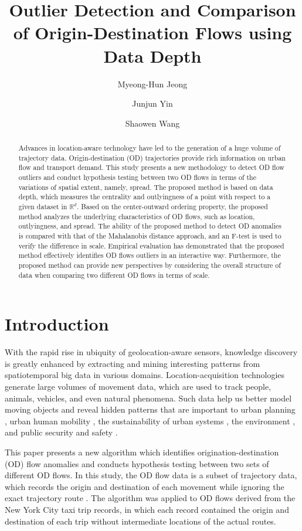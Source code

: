 \documentclass[a4paper,UKenglish]{lipics-v2018}
\title{Outlier Detection and Comparison of Origin-Destination Flows using Data Depth}
\author{Myeong-Hun Jeong}{Department of Civil Engineering, Chosun University, Gwangju, Republic of Korea}{mhjeong@chosun.ac.kr}{[orcid]}{[funding]}
\author{Junjun Yin}{Social Science Research Institute; Institute for CyberScience, Penn State University, PA, USA}{jyin@psu.edu}{[0000-0002-4196-2439]}{[This work used the Extreme Science and Engineering Discovery Environment (XSEDE), which is supported by National Science Foundation grant number ACI-1548562]}
\author{Shaowen Wang}{Department of Geography and Geographic Information Science, University of Illinois at Urbana-Champaign, IL, USA}{shaowen@illinois.edu}{[orcid]}{[funding]}
\begin{document}
\maketitle

\begin{abstract}
Advances in location-aware technology have led to the generation of a huge volume of trajectory data.
Origin-destination (OD) trajectories provide rich information on urban flow and transport demand.
This study presents a new methodology to detect OD flow outliers and conduct hypothesis testing between two OD flows in terms of the variations of spatial extent, namely, spread.
The proposed method is based on data depth, which measures the centrality and outlyingness of a point with respect to a given dataset in $\mathbb{R}^d$.
Based on the center-outward ordering property, the proposed method analyzes the underlying characteristics of OD flows, such as location, outlyingness, and spread.
The ability of the proposed method to detect OD anomalies is compared with that of the Mahalanobis distance approach, and an F-test is used to verify the difference in scale. Empirical evaluation has demonstrated that the proposed method effectively identifies OD flows outliers in an interactive way. Furthermore, the proposed method can provide new perspectives by considering the overall structure of data when comparing two different OD flows in terms of scale. 

 \end{abstract}

\section{Introduction}
With the rapid rise in ubiquity of geolocation-aware sensors, knowledge discovery is greatly enhanced by extracting and mining interesting patterns from spatiotemporal big data in various domains.
Location-acquisition technologies generate large volumes of movement data, which are used to track people, animals, vehicles, and even natural phenomena.
Such data help us better model moving objects and reveal hidden patterns that are important to urban planning \cite{mazimpaka15AGILE}, urban human mobility \cite{yin2017depicting,kwan1998space}, the sustainability of urban systems \cite{alberti2003integrating,chen13Percom}, the environment \cite{devarakonda13SIGKDD}, and public security and safety \cite{buchin14JOSIS}.

This paper presents a new algorithm which identifies origination-destination (OD) flow anomalies and conducts hypothesis testing between two sets of different OD flows.
In this study, the OD flow data is a subset of trajectory data, which records the origin and destination of each movement while ignoring the exact trajectory route \cite{guo14IEEETVCG}.
The algorithm was applied to OD flows derived from the New York City taxi trip records, in which each record contained the origin and destination of each trip without intermediate locations of the actual routes.
\end{document}
